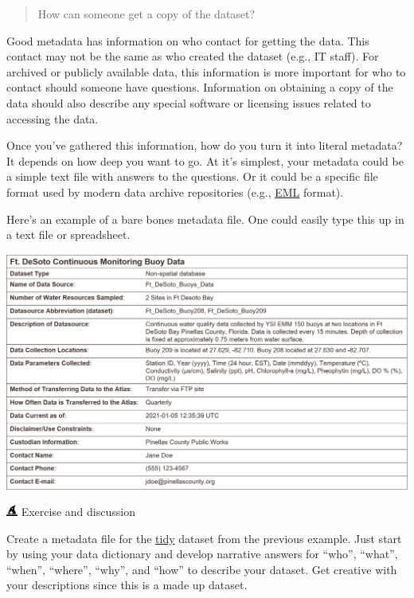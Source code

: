 \documentclass[
  letterpaper,
  DIV=11,
  numbers=noendperiod]{scrreprt}
\begin{document}
\begin{quote}
How can someone get a copy of the dataset?
\end{quote}

Good metadata has information on who contact for getting the data. This
contact may not be the same as who created the dataset (e.g., IT staff).
For archived or publicly available data, this information is more
important for who to contact should someone have questions. Information
on obtaining a copy of the data should also describe any special
software or licensing issues related to accessing the data.

Once you've gathered this information, how do you turn it into literal
metadata? It depends on how deep you want to go. At it's simplest, your
metadata could be a simple text file with answers to the questions. Or
it could be a specific file format used by modern data archive
repositories (e.g., \href{https://docs.ropensci.org/EML/}{EML} format).

Here's an example of a bare bones metadata file. One could easily type
this up in a text file or spreadsheet.

\includegraphics[width=6.17in,height=\textheight]{./img/desotometa.PNG}

\includegraphics[width=1em,height=1em]{./impact_files/figure-pdf/fa-icon-20d474448f872ee43905e611a2502347.pdf}
Exercise and discussion

Create a metadata file for the
\href{https://github.com/tbep-tech/cerf-os-workshop/raw/master/data/tidy.xlsx}{tidy}
dataset from the previous example. Just start by using your data
dictionary and develop narrative answers for ``who'', ``what'',
``when'', ``where'', ``why'', and ``how'' to describe your dataset. Get
creative with your descriptions since this is a made up dataset.
\end{document}
